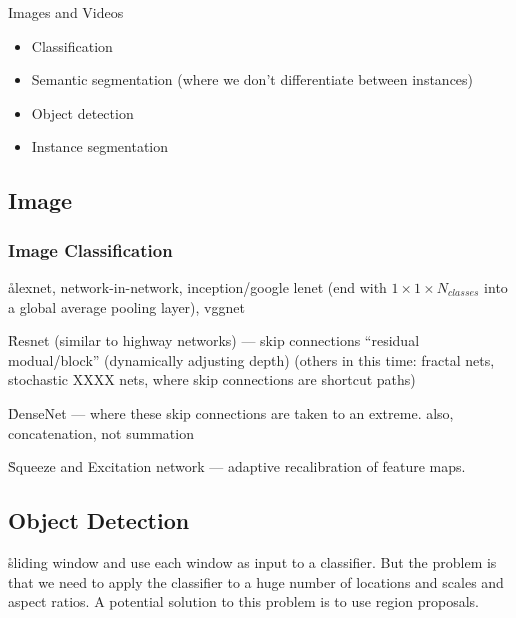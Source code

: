 



Images and Videos
\begin{itemize}[noitemsep,topsep=0pt]
	\item Classification
	\item Semantic segmentation (where we don't differentiate between instances)
	\item Object detection
	\item Instance segmentation
\end{itemize}



\subsection{Image}

\subsubsection{Image Classification}
\r{alexnet, network-in-network, inception/google lenet (end with $1 \times 1 \times N_{classes}$ into a global average pooling layer), vggnet}

\r{Resnet (similar to highway networks) --- skip connections ``residual modual/block'' (dynamically adjusting depth) (others in this time: fractal nets, stochastic XXXX nets, where skip connections are shortcut paths)}

\r{DenseNet --- where these skip connections are taken to an extreme. also, concatenation, not summation}

\r{Squeeze and Excitation network --- adaptive recalibration of feature maps. }



\subsection{Object Detection}

\r{sliding window and use each window as input to a classifier. But the problem is that we need to apply the classifier to a huge number of locations and scales and aspect ratios. A potential solution to this problem is to use region proposals.}

